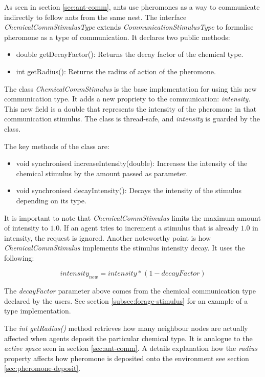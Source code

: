 As seen in section \ref{sec:ant-comm}, ants use pheromones as a way to communicate indirectly to fellow ants from the same nest. The interface \emph{ChemicalCommStimulusType} extends \emph{CommunicationStimulusType} to formalise pheromone as a type of communication. It declares two public methods:

\begin{itemize}
  \item double getDecayFactor(): Returns the decay factor of the chemical type. 
  \item int getRadius(): Returns the radius of action of the pheromone.
\end{itemize}

The class \emph{ChemicalCommStimulus} is the base implementation for using this new communication type. It adds a new propriety to the communication: \emph{intensity}. This new field is a double that represents the intensity of the pheromone in that communication stimulus. The class is thread-safe, and \emph{intensity} is guarded by the class.

The key methods of the class are:

\begin{itemize}
  \item void synchronised increaseIntensity(double): Increases the intensity of the chemical stimulus by the amount passed as parameter.
  
  \item void synchronised decayIntensity(): Decays the intensity of the stimulus depending on its type.
\end{itemize}

It is important to note that \emph{ChemicalCommStimulus} limits the maximum amount of intensity to $1.0$. If an agent tries to increment a stimulus that is already $1.0$ in intensity, the request is ignored.
Another noteworthy point is how \emph{ChemicalCommStimulus} implements the stimulus intensity decay. It uses the following:

\begin{equation} \label{eq:intensity-update}
intensity_{new} = intensity * (1 - decayFactor)
\end{equation}

The \emph{decayFactor} parameter above comes from the chemical communication type declared by the users. See section \ref{subsec:forage-stimulus} for an example of a type implementation.

The \emph{int getRadius()} method retrieves how many neighbour nodes are actually affected when agents deposit the particular chemical type. It is analogue to the \emph{active space} seen in section \ref{sec:ant-comm}. A details explanation how the \emph{radius} property affects how pheromone is deposited onto the environment see section \ref{sec:pheromone-deposit}.

